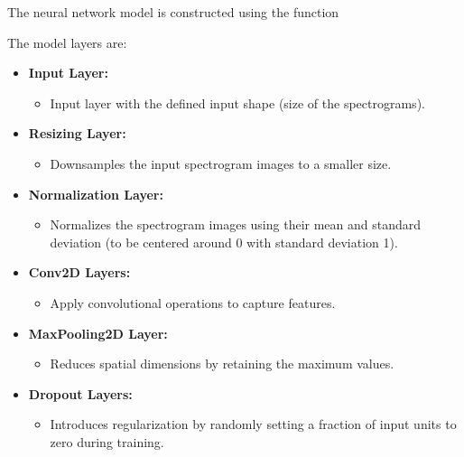\begin{code}[h!]
	    
	
	\caption{The neural network model is constructed using the  function}
	\label{code:neuralNetwork}
\end{code}

The model layers are:

\begin{itemize}
	\item \textbf{Input Layer:}
	\begin{itemize}
		\item Input layer with the defined input shape (size of the spectrograms).
	\end{itemize}
	
	\item \textbf{Resizing Layer:}
	\begin{itemize}
		\item Downsamples the input spectrogram images to a smaller size.
	\end{itemize}
	
	\item \textbf{Normalization Layer:}
	\begin{itemize}
		\item Normalizes the spectrogram images using their mean and standard deviation (to be centered around 0 with standard deviation 1).
	\end{itemize}
	
	\item \textbf{Conv2D Layers:}
	\begin{itemize}
		\item Apply convolutional operations to capture features.
	\end{itemize}
	
	\item \textbf{MaxPooling2D Layer:}
	\begin{itemize}
		\item Reduces spatial dimensions by retaining the maximum values.
	\end{itemize}
	
	\item \textbf{Dropout Layers:}
	\begin{itemize}
		\item Introduces regularization by randomly setting a fraction of input units to zero during training.
	\end{itemize}
	

\end{itemize}
